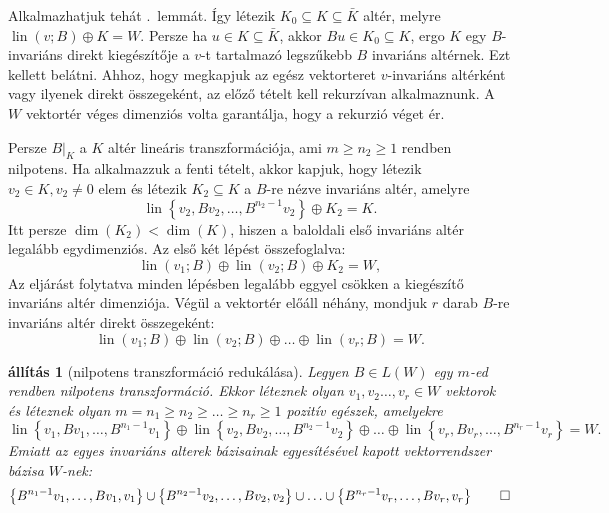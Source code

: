 \documentclass[9pt, a4paper, showtrims]{memoir}
\makeatletter
\renewenvironment{proof}[1][\proofname]
    {\par\pushQED{\qed}%
    \normalfont \topsep6\p@\@plus6\p@\relax
    \trivlist
    \item[\hskip\labelsep
        \itshape
    #1\@addpunct{:}]\ignorespaces}
    {\popQED\endtrivlist\@endpefalse}
\theoremstyle{plain}
\newtheorem{proposition}{állítás}[chapter]
\theoremstyle{remark}
\theoremstyle{definition}
\DeclareMathOperator{\lin}{lin}
\makeatother
\begin{document}
\begin{proof}
	Alkalmazhatjuk tehát .~lemmát.
	Így létezik $K_0\subseteq K\subseteq\bar{K}$ altér, melyre $\lin(v;B)\oplus K=W.$
	Persze ha $u\in K\subseteq\bar{K}$, akkor $Bu\in K_0\subseteq K$, ergo $K$ egy $B$-invariáns direkt kiegészítője a
	$v$-t tartalmazó legszűkebb $B$ invariáns altérnek.
	Ezt kellett belátni.
\end{proof}
Ahhoz, hogy megkapjuk az egész vektorteret $v$-invariáns altérként vagy ilyenek direkt összegeként, az előző tételt
kell rekurzívan alkalmaznunk.
A $W$ vektortér véges dimenziós volta garantálja, hogy a rekurzió véget ér.

Persze $B|_K$ a $K$ altér lineáris transzformációja,
ami $m\geq n_2\geq 1$ rendben nilpotens.
Ha alkalmazzuk a fenti tételt, akkor kapjuk,
hogy létezik $v_2\in K, v_2\neq 0$ elem és létezik $K_2\subseteq K$ a $B$-re nézve invariáns altér,
amelyre
\[
	\lin\left\{ v_2,Bv_2,\ldots,B^{n_2-1}v_2 \right\}
	\oplus
	K_2=K.
\]
Itt persze $\dim(K_2)<\dim(K)$, hiszen a baloldali első invariáns altér legalább egydimenziós.
Az első két lépést összefoglalva:
\[
	\lin(v_1;B)
	\oplus
	\lin(v_2;B)
	\oplus
	K_2=W,
\]
Az eljárást folytatva minden lépésben legalább eggyel csökken a kiegészítő invariáns altér dimenziója.
Végül a vektortér előáll néhány, mondjuk $r$ darab $B$-re invariáns altér direkt összegeként:
\[
	\lin(v_1;B)
	\oplus
	\lin(v_2;B)
	\oplus
	\ldots
    \oplus
	\lin(v_r;B)
	=W.
\]
\begin{proposition}[nilpotens transzformáció redukálása]
	Legyen $B\in L\left( W \right)$ egy $m$-ed rendben nilpotens transzformáció.
	Ekkor léteznek olyan $v_1,v_2\dots,v_r\in W$ vektorok és
	léteznek olyan $m=n_1\geq n_2\geq \dots\geq n_r\geq 1$ pozitív egészek,
	amelyekre
	\[
		\lin\left\{ v_1,Bv_1,\ldots,B^{n_1-1}v_1 \right\}
		\oplus
		\lin\left\{ v_2,Bv_2,\ldots,B^{n_2-1}v_2 \right\}
		\oplus
		\ldots
		\oplus
		\lin\left\{ v_r,Bv_r,\ldots,B^{n_r-1}v_r \right\}
		=
		W.
	\]
	Emiatt az egyes invariáns alterek bázisainak egyesítésével kapott vektorrendszer bázisa $W$-nek:
	\[
		\left\{ B^{n_1-1}v_1,\ldots,Bv_1,v_1 \right\}
		\cup
		\left\{ B^{n_2-1}v_2,\ldots,Bv_2,v_2 \right\}
		\cup
		\ldots
		\cup
		\left\{ B^{n_r-1}v_r,\ldots,Bv_r,v_r \right\}
		\qedhere
	\]
\end{proposition}
\end{document}
